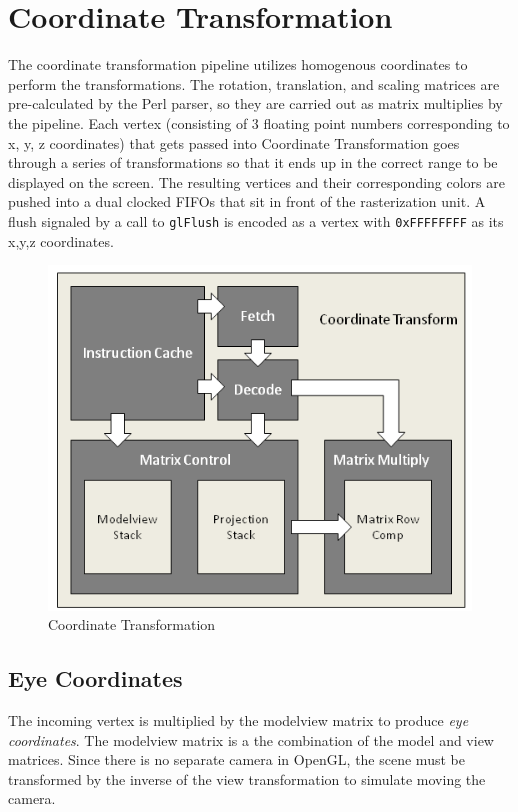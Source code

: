 \documentclass[letterpaper,10pt]{article}
\begin{document}
\section{Coordinate Transformation}
The coordinate transformation pipeline utilizes homogenous coordinates to perform the transformations. The rotation, translation, and scaling matrices are pre-calculated by the Perl parser, so they are carried out as matrix multiplies by the pipeline. Each vertex (consisting of 3 floating point numbers corresponding to x, y, z coordinates) that gets passed into Coordinate Transformation goes through a series of transformations so that it ends up in the correct range to be displayed on the screen. The resulting vertices and their corresponding colors are pushed into a dual clocked FIFOs that sit in front of the rasterization unit. A flush signaled by a call to \verb!glFlush! is encoded as a vertex with \verb!0xFFFFFFFF! as its x,y,z coordinates.

\begin{figure}[h!]
\begin{center}
\includegraphics[scale=.80]{coordinate_transform.png}
\end{center}
\caption{Coordinate Transformation}
\label{fig:coordinate_transform}
\end{figure}

\subsection{Eye Coordinates}
The incoming vertex is multiplied by the modelview matrix to produce \emph{eye coordinates}. The modelview matrix is a the combination of the model and view matrices. Since there is no separate camera in OpenGL, the scene must be transformed by the inverse of the view transformation to simulate moving the camera.\\
\end{document}

